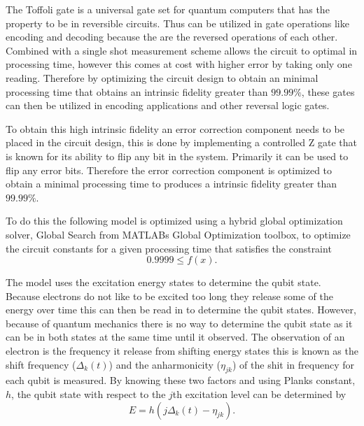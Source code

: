 


The Toffoli gate is a universal gate set\cite{Zahedinejad2015} for quantum computers that has the property to be in reversible circuits.   Thus can be utilized in gate operations like encoding and decoding because the are the reversed operations of each other. Combined with a single shot measurement scheme allows the circuit to optimal in processing time, however this comes at cost with higher error by taking only one reading. Therefore by optimizing the circuit design to obtain an minimal
processing time that obtains an intrinsic fidelity greater than $99.99\%$, these gates can then be utilized in encoding applications and other reversal logic gates. 

To obtain this high intrinsic fidelity an error correction component needs to be placed in the circuit design, this is done by implementing a controlled Z gate that is known for its ability to flip any bit in the system. Primarily it can be used to flip any error bits. Therefore the error correction component is optimized to obtain a minimal processing time to produces a intrinsic fidelity greater than $99.99\%$\cite{Barends2014}.

To do this the following model is optimized using a hybrid global optimization solver, Global Search from MATLABs Global Optimization toolbox, to optimize the circuit constants for a given processing time that satisfies the constraint
\begin{equation*}
    0.9999 \leq f(x).
\end{equation*}

The model uses the excitation energy states to determine the qubit state. Because electrons do not like to be excited too long they release some of the energy over time this can then be read in to determine the qubit states. However, because of quantum mechanics there is no way to determine the qubit state as it can be in both states at the same time until it observed. The observation of an electron is the frequency it release from shifting energy states this is known as the shift frequency
($\Delta_k(t)$) and the anharmonicity  ($\eta_{jk}$) of the shit in frequency for each qubit is measured. By knowing these two factors and using Planks constant, $h$, the qubit state with respect to the $j$th excitation level can be determined by
\begin{equation}
  \label{eq:qubit energy}
  E = h(j\Delta_k(t)-\eta_{jk}).
\end{equation}

